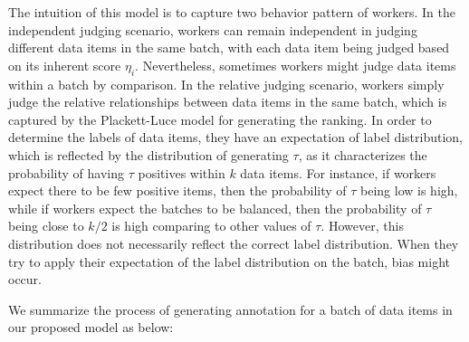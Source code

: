 
The intuition of this model is to capture two behavior pattern of workers.
In the independent judging scenario,
workers can remain independent in judging different data items in the same batch,
with each data item being judged based on its inherent score $\eta_i$.
Nevertheless, sometimes workers might judge data items 
within a batch by comparison.
In the relative judging scenario,
workers simply judge the relative 
relationships between data items in the same batch,
which is captured by the Plackett-Luce model for generating the ranking.
In order to determine the labels of data items,
they have an expectation of label distribution,
which is reflected by the distribution of generating $\tau$,
as it characterizes the probability of having $\tau$ positives within $k$ data items.
For instance, if workers expect
there to be few positive items, then the probability of $\tau$
being low is high, while if workers expect
the batches to be balanced, then the probability of $\tau$ being close to
$k/2$ is high comparing to other values of $\tau$.
However, this distribution does not necessarily 
reflect the correct label distribution.
When they try to apply their expectation 
of the label distribution on the batch, bias might occur.

We summarize the process of generating annotation for a batch of data items in our proposed model as below:

